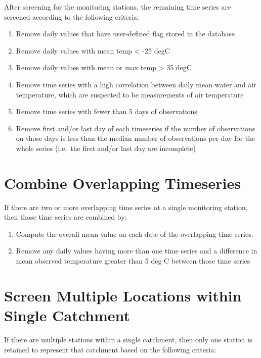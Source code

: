\documentclass[
]{book}
\providecommand{\tightlist}{%
  \setlength{\itemsep}{0pt}\setlength{\parskip}{0pt}}
\begin{document}
After screening for the monitoring stations, the remaining time series are screened according to the following criteria:

\begin{enumerate}
\def\labelenumi{\arabic{enumi}.}
\tightlist
\item
  Remove daily values that have user-defined flag stored in the database
\item
  Remove daily values with mean temp \textless{} -25 degC
\item
  Remove daily values with mean or max temp \textgreater{} 35 degC
\item
  Remove time series with a high correlation between daily mean water and air temperature, which are suspected to be measurements of air temperature
\item
  Remove time series with fewer than 5 days of observations
\item
  Remove first and/or last day of each timeseries if the number of observations on those days is less than the median number of observations per day for the whole series (i.e.~the first and/or last day are incomplete)
\end{enumerate}

\section{Combine Overlapping Timeseries}\label{combine-overlapping-timeseries}

If there are two or more overlapping time series at a single monitoring station, then those time series are combined by:

\begin{enumerate}
\def\labelenumi{\arabic{enumi}.}
\tightlist
\item
  Compute the overall mean value on each date of the overlapping time series.
\item
  Remove any daily values having more than one time series and a difference in mean observed temperature greater than 5 deg C between those time series
\end{enumerate}

\section{Screen Multiple Locations within Single Catchment}\label{screen-multiple-locations-within-single-catchment}

If there are multiple stations within a single catchment, then only one station is retained to represent that catchment based on the following criteria:
\end{document}
